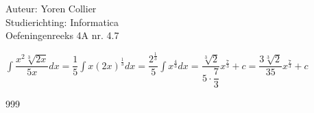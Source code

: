 \documentclass[a4paper]{article}
\newcommand{\Lh}{\left(} %
\newcommand{\Rh}{\right)}
\newcommand{\intgrl}{\displaystyle\int} %
\begin{document}
\noindent \large Auteur: Yoren Collier \\
\noindent \large Studierichting: Informatica\\
\noindent \large Oefeningenreeks 4A nr. 4.7\\

\medskip

\normalsize

$ \intgrl \dfrac{x^2 \sqrt[3]{2x}}{5x} dx = \dfrac{1}{5} \intgrl x \Lh 2x \Rh ^{\tfrac{1}{3}} dx = \dfrac{2^{\tfrac{1}{3}}}{5} \intgrl x^{\tfrac{4}{3}} dx = \dfrac{\sqrt[3]{2}}{5\cdot \dfrac{7}{3}} x^{\tfrac{7}{3}} +c = \dfrac{3 \sqrt[3]{2}}{35} x^{\tfrac{7}{3}} +c$\\

\begin{thebibliography}{999}
\end{thebibliography}
\end{document}
